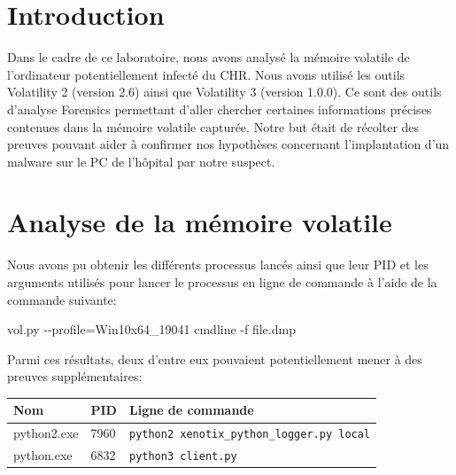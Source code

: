 \documentclass[a4paper]{article}
\begin{document}
\let\cleardoublepage\clearpage










\tableofcontents \newpage










\section{Introduction}

Dans le cadre de ce laboratoire, nous avons analysé la mémoire volatile de l'ordinateur potentiellement infecté du CHR. Nous avons utilisé les outils Volatility 2 (version 2.6) ainsi que Volatility 3 (version 1.0.0). Ce sont des outils d'analyse Forensics permettant d'aller chercher certaines informations précises contenues dans la mémoire volatile capturée. Notre but était de récolter des preuves pouvant aider à confirmer nos hypothèses concernant l'implantation d'un malware sur le PC de l'hôpital par notre suspect.










\section{Analyse de la mémoire volatile}

Nous avons pu obtenir les différents processus lancés ainsi que leur PID et les arguments utilisés pour lancer le processus en ligne de commande à l'aide de la commande suivante:
\begin{example}
    vol.py -{}-profile=Win10x64\_19041 cmdline -f file.dmp
\end{example}
Parmi ces résultats, deux d'entre eux pouvaient potentiellement mener à des preuves supplémentaires:
\begin{center}
    \begin{tabular}{lll} \hline
        \textbf{Nom} & \textbf{PID} & \textbf{Ligne de commande} \\ \hline
        python2.exe  & 7960         & \texttt{\small python2 xenotix\_python\_logger.py local} \\
        python.exe   & 6832         & \texttt{\small python3 client.py} \\ \hline
    \end{tabular}
\end{center}
\end{document}

